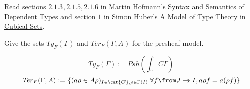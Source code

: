\def\pathToRoot{../../}
\usepackage{semantic}



\author{Nikita Ziuzin}

\begin{hint}
  Read sections $2.1.3, 2.1.5, 2.1.6$ in Martin Hofmann's \href{http://www.irif.fr/~mellies/mpri/mpri-ens/articles/hofmann-syntax-and-semantics-of-dependent-types.pdf}{Syntax and Semantics of Dependent Types} and section $1$ in Simon Huber's \href{http://www.cse.chalmers.se/~simonhu/misc/lic.pdf}{A Model of Type Theory in Cubical Sets}.
\end{hint}

\begin{exercise}
  Give the sets $\mathit{Ty}_F(\Gamma)$ and $\mathit{Ter}_F(\Gamma, A)$ for
  the presheaf model.
\end{exercise}
\begin{answer}
  \[
    \mathit{Ty}_F(\Gamma) := \mathit{Psh(\int_\cat{C} \Gamma)}
  \]
  \[
    \mathit{Ter}_F(\Gamma, A) := \{(a\rho \in A\rho)_{I \in \cat{C}, \rho \in \Gamma(I)} | \forall f \from J \to I, a\rho f = a(\rho f) \}
  \]
\end{answer}

